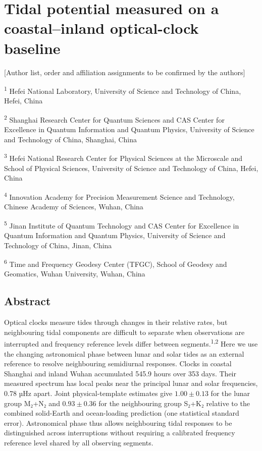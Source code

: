 \documentclass[
  10pt,
  a4paper,
]{article}
\author{}
\date{}
\begin{document}
\hypertarget{tidal-potential-measured-on-a-coastalinland-optical-clock-baseline}{%
\section{Tidal potential measured on a coastal--inland optical-clock
baseline}\label{tidal-potential-measured-on-a-coastalinland-optical-clock-baseline}}

{[}Author list, order and affiliation assignments to be confirmed by the
authors{]}

\textsuperscript{1} Hefei National Laboratory, University of Science and
Technology of China, Hefei, China

\textsuperscript{2} Shanghai Research Center for Quantum Sciences and
CAS Center for Excellence in Quantum Information and Quantum Physics,
University of Science and Technology of China, Shanghai, China

\textsuperscript{3} Hefei National Research Center for Physical Sciences
at the Microscale and School of Physical Sciences, University of Science
and Technology of China, Hefei, China

\textsuperscript{4} Innovation Academy for Precision Measurement Science
and Technology, Chinese Academy of Sciences, Wuhan, China

\textsuperscript{5} Jinan Institute of Quantum Technology and CAS Center
for Excellence in Quantum Information and Quantum Physics, University of
Science and Technology of China, Jinan, China

\textsuperscript{6} Time and Frequency Geodesy Center (TFGC), School of
Geodesy and Geomatics, Wuhan University, Wuhan, China

\hypertarget{abstract}{%
\subsection{Abstract}\label{abstract}}

Optical clocks measure tides through changes in their relative rates,
but neighbouring tidal components are difficult to separate when
observations are interrupted and frequency reference levels differ
between segments.\textsuperscript{1,2} Here we use the changing
astronomical phase between lunar and solar tides as an external
reference to resolve neighbouring semidiurnal responses. Clocks in
coastal Shanghai and inland Wuhan accumulated 545.9 hours over 353 days.
Their measured spectrum has local peaks near the principal lunar and
solar frequencies, 0.78 µHz apart. Joint physical-template estimates
give \(1.00\pm0.13\) for the lunar group M₂+N₂ and \(0.93\pm0.36\) for
the neighbouring group S₂+K₂ relative to the combined solid-Earth and
ocean-loading prediction (one statistical standard error). Astronomical
phase thus allows neighbouring tidal responses to be distinguished
across interruptions without requiring a calibrated frequency reference
level shared by all observing segments.
\end{document}
